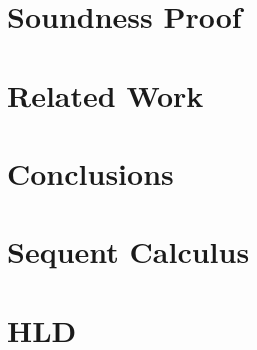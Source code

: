 \documentclass{llncs}
\begin{document}
\section{Soundness Proof}
%

\section{Related Work}


\section{Conclusions}





\appendix
\section{Sequent Calculus}

\section{HLD}


\iffalse
\clearpage
\section{LLD}

\fi
\end{document}
